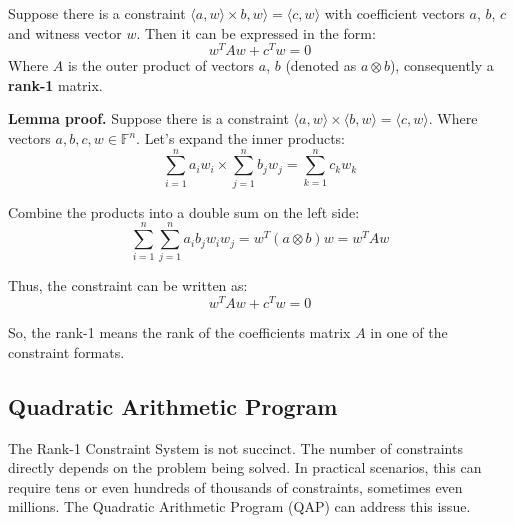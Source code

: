 \documentclass[../lecture-notes.tex]{subfiles}
\begin{document}
\begin{lemma}
    Suppose there is a constraint $\langle a, w\rangle \times b, w\rangle = \langle c, w \rangle$ 
    with coefficient vectors $a$, $b$, $c$ and witness vector $w$. Then it can be expressed in the 
    form:
    \[ w^T A w + c^T w = 0 \]
    Where $A$ is the outer product of vectors $a$, $b$ (denoted as $a \otimes b$), consequently 
    a \textbf{rank-1} matrix.
\end{lemma}

\textbf{Lemma proof.} Suppose there is a constraint $\langle a, w\rangle \times \langle b, w\rangle
= \langle c, w\rangle$. Where vectors $a, b, c, w \in \mathbb{F}^n $. Let's expand the inner
products: 
\[ \sum_{i=1}^{n} a_i w_i \times \sum_{j=1}^{n} b_j w_j = \sum_{k=1}^{n} c_k w_k \]

Combine the products into a double sum on the left side:
\[ \sum_{i=1}^{n} \sum_{j=1}^{n} a_i b_j w_i w_j = w^T (a \otimes b) w = w^T A w \]

Thus, the constraint can be written as:
\[ w^T A w + c^T w = 0 \]

So, the rank-1 means the rank of the coefficients matrix $A$ in one of the constraint formats.

\subsection{Quadratic Arithmetic Program}

The Rank-1 Constraint System is not succinct. The number of constraints directly depends
on the problem being solved. In practical scenarios, this can require tens or even hundreds of
thousands of constraints, sometimes even millions. The Quadratic Arithmetic Program (QAP) can 
address this issue.
\end{document}
